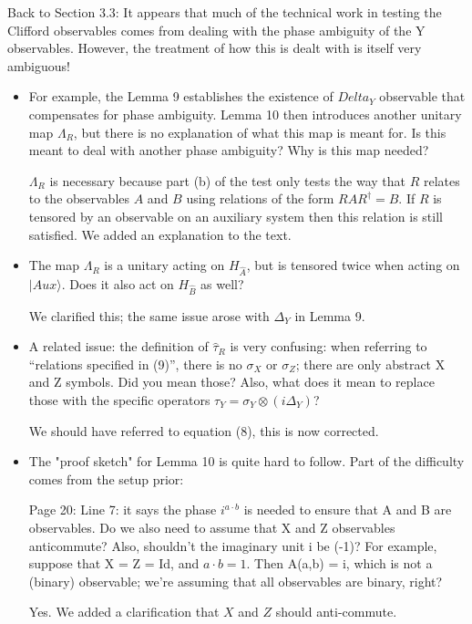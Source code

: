\documentclass[12pt]{article}
\newcommand{\ket}[1]{|#1\rangle}
\begin{document}
Back to Section 3.3: It appears that much of the technical work in testing the Clifford observables comes from dealing with the phase ambiguity of the Y observables. However, the treatment of how this is dealt with is itself very ambiguous!
\begin{itemize}
\item For example, the Lemma 9 establishes the existence of $Delta_Y$ observable that compensates for phase ambiguity. Lemma 10 then introduces another unitary map $\Lambda_R$, but there is no explanation of what this map is meant for. Is this meant to deal with another phase ambiguity? Why is this map needed?

{\color{blue} $\Lambda_R$ is necessary because part (b) of the test only tests the way that $R$ relates to the observables $A$ and $B$ using relations of the form $RAR^\dagger = B$. If $R$ is tensored by an observable on an auxiliary system then this relation is still satisfied. We added an explanation to the text.}

\item The map $\Lambda_R$ is a unitary acting on $H_{\hat{A}}$, but is tensored twice when acting on $\ket{Aux}$. Does it also act on $H_{\hat{B}}$ as well? 

{\color{blue} We clarified this; the same issue arose with $\Delta_Y$ in Lemma 9.}

\item A related issue: the definition of $\hat{\tau}_R$ is very confusing: when referring to “relations specified in (9)”, there is no $\sigma_X$ or $\sigma_Z$; there are only abstract X and Z symbols. Did you mean those? Also, what does it mean to replace those with the specific operators $\tau_Y = \sigma_Y \otimes (i \Delta_Y)$? 

{\color{blue} We should have referred to equation (8), this is now corrected.}

\item The "proof sketch" for Lemma 10 is quite hard to follow. Part of the difficulty comes from the setup prior:

Page 20: Line 7: it says the phase $i^{a \cdot b}$ is needed to ensure that A and B are observables. Do we also need to assume that X and Z observables anticommute? Also, shouldn’t the imaginary unit i be (-1)? For example, suppose that X = Z = Id, and $a \cdot b = 1$. Then A(a,b) = i, which is not a (binary) observable; we’re assuming that all observables are binary, right?

{\color{blue} Yes. We added a clarification that $X$ and $Z$ should anti-commute.}


\end{itemize}
\end{document}
